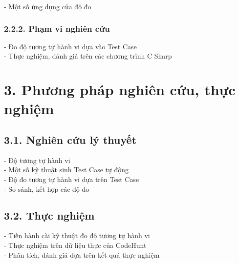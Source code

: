 - Một số ứng dụng của độ đo \\

\subsubsection*{2.2.2. Phạm vi nghiên cứu}
- Đo độ tương tự hành vi dựa vào Test Case \\

- Thực nghiệm, đánh giá trên các chương trình C Sharp \\



\section*{3. Phương pháp nghiên cứu, thực nghiệm}

\subsection*{3.1. Nghiên cứu lý thuyết}
- Độ tương tự hành vi \\

- Một số kỹ thuật sinh Test Case tự động \\

- Độ đo tương tự hành vi dựa trên Test Case \\

- So sánh, kết hợp các độ đo \\

\subsection*{3.2. Thực nghiệm}
- Tiến hành cài kỹ thuật đo độ tương tự hành vi \\ 

- Thực nghiệm trên dữ liệu thực của CodeHunt \\

- Phân tích, đánh giá dựa trên kết quả thực nghiệm \\


